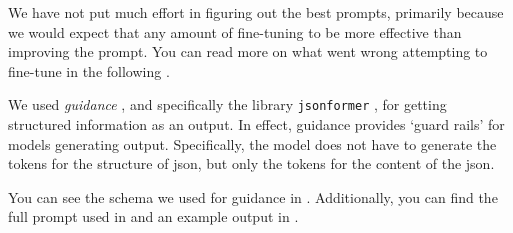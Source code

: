 We have not put much effort in figuring out the best prompts, primarily because we would expect that any amount of fine-tuning to be more effective than improving the prompt. You can read more on what went wrong attempting to fine-tune in the following .

We used \textit{guidance} \cite{guidance_2023}, and specifically the library \texttt{jsonformer} \cite{1rgs_2023}, for getting structured information as an output.
In effect, guidance provides `guard rails' for models generating output.
Specifically, the model does not have to generate the tokens for the structure of json, but only the tokens for the content of the json.


You can see the schema we used for guidance in . Additionally, you can find the full prompt used in  and an example output in .






